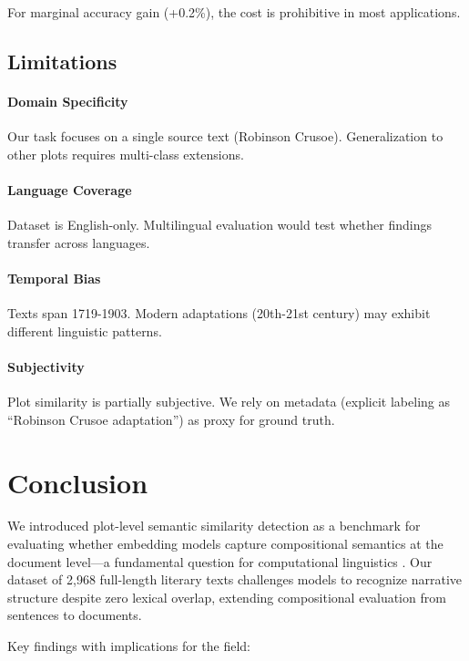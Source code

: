 \documentclass[11pt]{article}
\begin{document}
For marginal accuracy gain (+0.2\%), the cost is prohibitive in most applications.

\subsection{Limitations}

\paragraph{Domain Specificity} Our task focuses on a single source text (Robinson Crusoe). Generalization to other plots requires multi-class extensions.

\paragraph{Language Coverage} Dataset is English-only. Multilingual evaluation would test whether findings transfer across languages.

\paragraph{Temporal Bias} Texts span 1719-1903. Modern adaptations (20th-21st century) may exhibit different linguistic patterns.

\paragraph{Subjectivity} Plot similarity is partially subjective. We rely on metadata (explicit labeling as ``Robinson Crusoe adaptation'') as proxy for ground truth.

\section{Conclusion}

We introduced plot-level semantic similarity detection as a benchmark for evaluating whether embedding models capture compositional semantics at the document level---a fundamental question for computational linguistics \cite{Partee1995,Baroni2014Compositional}. Our dataset of 2,968 full-length literary texts challenges models to recognize narrative structure despite zero lexical overlap, extending compositional evaluation from sentences \cite{Fodor2025Compositionality} to documents.

Key findings with implications for the field:
\end{document}

